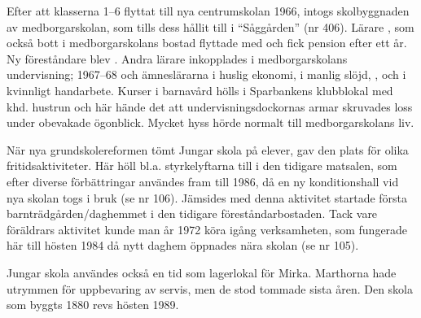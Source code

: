 Efter att klasserna 1--6 flyttat till nya centrumskolan 1966, intogs skolbyggnaden av medborgarskolan, som tills dess hållit till i ``Såggården'' (nr 406). Lärare , som också bott i medborgarskolans bostad flyttade med och fick pension efter ett år. Ny föreståndare blev . Andra lärare inkopplades i medborgarskolans undervisning;  1967--68 och ämneslärarna  i huslig ekonomi,  i manlig slöjd, ,  och  i kvinnligt handarbete. Kurser i barnavård hölls i Sparbankens klubblokal med khd. hustrun  och här hände det att undervisningsdockornas armar skruvades loss under obevakade ögonblick. Mycket hyss hörde normalt till medborgarskolans liv.

När nya grundskolereformen tömt Jungar skola på elever, gav den plats för olika fritidsaktiviteter. Här höll bl.a. styrkelyftarna till i den tidigare matsalen, som efter diverse förbättringar användes fram till 1986, då en ny konditionshall vid nya skolan togs i bruk (se nr 106). Jämsides med denna aktivitet startade första barnträdgården/daghemmet i den tidigare föreståndarbostaden. Tack vare föräldrars aktivitet kunde man år 1972 köra igång verksamheten, som fungerade här till hösten 1984 då nytt daghem öppnades nära skolan (se nr 105).

Jungar skola användes också en tid som lagerlokal för Mirka. Marthorna hade utrymmen för uppbevaring av servis, men de stod tommade sista åren. Den skola som byggts 1880 revs hösten 1989.



%

\jhnooccupant{}

